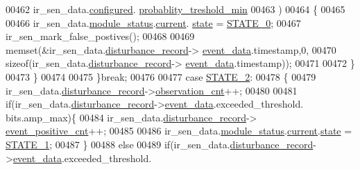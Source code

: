 \begin{DoxyCode}
00462                            ir\_sen\_data.\hyperlink{a00023_a94b2d1f6ea4ab334c74d24984dd27843}{configured}.
      \hyperlink{a00021_aa59261f74183d4f9e909ac425e0bea35}{probablity\_treshold\_min}
00463                            )
00464                          \{
00465 
00466                              ir\_sen\_data.\hyperlink{a00023_a5a53c391562b059eb744ac679f3765ca}{module\_status}.\hyperlink{a00017_ab8af48cdbba92b3ae39c4470e53af944}{current}.
      \hyperlink{a00017_a6b8d8e916bc56265a3fd279bd26b6d1b}{state} = \hyperlink{a00021_ad6739dbbe5581cac99b7dc8a5e09949c}{STATE\_0};
00467                              ir\_sen\_mark\_false\_postives();
00468 
00469                              memset(&ir\_sen\_data.\hyperlink{a00023_ac9b38e2c1d3f1013a88d33506c754152}{disturbance\_record}->
      \hyperlink{a00028_a8c0bda69e71ef674e60da47ad0be9ab0}{event\_data}.timestamp,0,
00470                                      \textcolor{keyword}{sizeof}(ir\_sen\_data.\hyperlink{a00023_ac9b38e2c1d3f1013a88d33506c754152}{disturbance\_record}->
      \hyperlink{a00028_a8c0bda69e71ef674e60da47ad0be9ab0}{event\_data}.timestamp));
00471 
00472                         \}
00473              \}
00474 
00475         \}\textcolor{keywordflow}{break};
00476 
00477          \textcolor{keywordflow}{case} \hyperlink{a00021_a66fa48e832a64af4d405511cecc4c752}{STATE\_2}: 
00478         \{
00479             ir\_sen\_data.\hyperlink{a00023_ac9b38e2c1d3f1013a88d33506c754152}{disturbance\_record}->\hyperlink{a00028_ad5b0bac02ce266b91b2b52a1c3ea1d78}{observation\_cnt}++;
00480 
00481             \textcolor{keywordflow}{if}(ir\_sen\_data.\hyperlink{a00023_ac9b38e2c1d3f1013a88d33506c754152}{disturbance\_record}->\hyperlink{a00028_a8c0bda69e71ef674e60da47ad0be9ab0}{event\_data}.exceeded\_threshold.
      bits.amp\_max)\{
00484                  ir\_sen\_data.\hyperlink{a00023_ac9b38e2c1d3f1013a88d33506c754152}{disturbance\_record}->
      \hyperlink{a00028_a7397b9d76d4b57500f27bb23d258a18a}{event\_positive\_cnt}++;
00485 
00486                  ir\_sen\_data.\hyperlink{a00023_a5a53c391562b059eb744ac679f3765ca}{module\_status}.\hyperlink{a00017_ab8af48cdbba92b3ae39c4470e53af944}{current}.\hyperlink{a00017_a6b8d8e916bc56265a3fd279bd26b6d1b}{state} = 
      \hyperlink{a00021_a727351838367f27ac0adb9a13422c342}{STATE\_1};
00487             \}
00488             \textcolor{keywordflow}{else}
00489              \textcolor{keywordflow}{if}(ir\_sen\_data.\hyperlink{a00023_ac9b38e2c1d3f1013a88d33506c754152}{disturbance\_record}->\hyperlink{a00028_a8c0bda69e71ef674e60da47ad0be9ab0}{event\_data}.exceeded\_threshold.

\end{DoxyCode}
